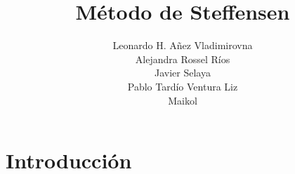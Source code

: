 \documentclass[10pt,letterpaper]{article}
\author{Leonardo H. Añez Vladimirovna\\
Alejandra Rossel Ríos \\
Javier Selaya\\
Pablo Tardío Ventura
Liz \\
Maikol}
\title{Método de Steffensen}
\begin{document}
\maketitle
\pagebreak
\section{Introducción}
\end{document}
